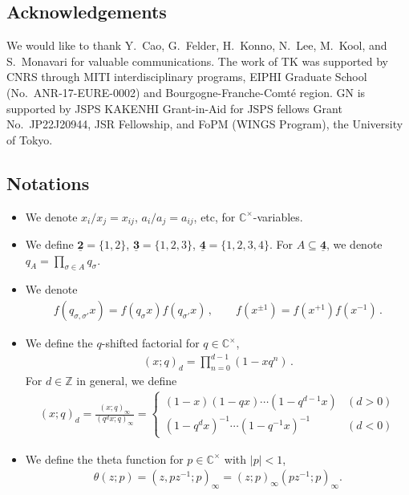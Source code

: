 \subsection*{Acknowledgements}

We would like to thank Y.~Cao, G.~Felder, H.~Konno, N.~Lee, M.~Kool, and S.~Monavari for valuable communications.
The work of TK was supported by CNRS through MITI interdisciplinary programs, EIPHI Graduate School (No.~ANR-17-EURE-0002) and Bourgogne-Franche-Comté region. GN is supported by JSPS KAKENHI Grant-in-Aid for JSPS fellows Grant No.~JP22J20944, JSR Fellowship, and FoPM (WINGS Program), the University of Tokyo.

\subsection*{Notations}

\begin{itemize}
    \item 
    We denote $x_i/x_j = x_{ij}$, $a_i/a_j = a_{ij}$, etc, for $\mathbb{C}^\times$-variables.

    \item 
    We define
    $\underline{\mathbf{2}} = \{1,2\}$,
    $\underline{\mathbf{3}} = \{1,2,3\}$,
    $\underline{\mathbf{4}} = \{1,2,3,4\}$.
    For $A \subseteq \underline{\mathbf{4}}$, we denote $q_A = \prod_{\sigma \in A} q_\sigma$.

    \item 
    We denote
    \begin{align}
        f(q_{\sigma,\sigma'} x) = f(q_\sigma x) f(q_{\sigma'} x)
        \, , \qquad 
        f(x^{\pm 1} ) = f(x^{+1}) f(x^{-1})
        \, .
    \end{align}

    \item 
    We define the $q$-shifted factorial for $q \in \mathbb{C}^\times$,
    \begin{align}
        (x;q)_d = \prod_{n=0}^{d-1} (1 - x q^n)
        \, .
    \end{align}
    For $d \in \mathbb{Z}$ in general, we define
    \begin{align}
        (x;q)_d = \frac{(x;q)_\infty}{(q^d x;q)_\infty} =
        \begin{cases}
            (1-x)(1-qx) \cdots (1-q^{d-1}x) & (d > 0) \\
            (1-q^d x)^{-1} \cdots (1-q^{-1}x)^{-1} & (d < 0)
        \end{cases}
    \end{align}

    \item 
    We define the theta function for $p \in \mathbb{C}^\times$ with $|p| < 1$,
    \begin{align}
        \theta(z;p) = (z,pz^{-1};p)_\infty = (z;p)_\infty (pz^{-1};p)_\infty .
    \end{align}  
\end{itemize}




